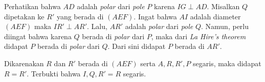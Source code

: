     Perhatikan bahwa $AD$ adalah \textit{polar} dari \textit{pole} $P$ karena $IG \perp AD$.
    Misalkan $Q$ dipetakan ke $R'$ yang berada di $(AEF)$. Ingat bahwa $AI$ adalah diameter $(AEF)$ maka $IR' \perp AR'$. 
    Lalu, $AR'$ adalah \textit{polar} dari \textit{pole} $Q$. 
    Namun, perlu diingat bahwa karena $Q$ berada di \textit{polar} dari $P$, maka dari \textit{La Hire's theorem} didapat $P$ berada di \textit{polar} dari $Q$. Dari sini didapat $P$ berada di $AR'$.

    Dikarenakan $R$ dan $R'$ berada di $(AEF)$ serta $A,R,R',P$ segaris, maka didapat $R=R'$. Terbukti bahwa $I,Q,R'=R$ segaris.

